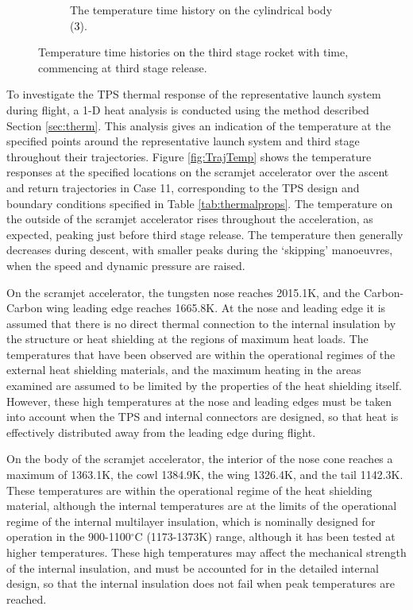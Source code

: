 \begin{figure}[ht]
\begin{subfigure}{.495\textwidth}
		\caption{The temperature time history on the cylindrical body (\textcolor{black}{3}).}
	\end{subfigure}
	\caption{Temperature time histories on the third stage rocket with time, commencing at third stage release. }
	\label{fig:TrajTemp3}
\end{figure}
\noindent
To investigate the TPS thermal response of the representative launch system during flight, a 1-D heat analysis is conducted using the method described Section \ref{sec:therm}.
This analysis gives an indication of the temperature at the specified points around the representative launch system and third stage throughout their trajectories. 
Figure \ref{fig:TrajTemp} shows the temperature responses at the specified locations on the scramjet accelerator over the ascent and return trajectories in Case 11, corresponding to the TPS design and boundary conditions specified in Table \ref{tab:thermalprops}. The temperature on the outside of the scramjet accelerator rises throughout the acceleration, as expected, peaking just before third stage release. The temperature then generally decreases during descent, with smaller peaks during the `skipping' manoeuvres, when the speed and dynamic pressure are raised.

On the scramjet accelerator, the tungsten nose reaches 2015.1K, and the Carbon-Carbon wing leading edge reaches 1665.8K. 
At the nose and leading edge it is assumed that there is no direct thermal connection to the internal insulation by the structure or heat shielding at the regions of maximum heat loads. The temperatures that have been observed are within the operational regimes of the external heat shielding materials\cite{Fitzer,Leonhardt}, and the maximum heating in the areas examined are assumed to be limited by the properties of the heat shielding itself. However, these high temperatures at the nose and leading edges must be taken into account when the TPS and internal connectors are designed, so that heat is effectively distributed away from the leading edge during flight. 

On the body of the scramjet accelerator, the interior of the nose cone reaches a maximum of 1363.1K, the cowl 1384.9K, the wing 1326.4K, and the tail 1142.3K.
These temperatures are within the operational regime of the heat shielding material, although the internal temperatures are at the limits of the operational regime of the internal multilayer insulation, which is nominally designed for operation in the 900-1100$^\circ$C (1173-1373K) range, although it has been tested at higher temperatures\cite{Kourtides}. These high temperatures may affect the mechanical strength of the internal insulation\cite{Kourtides}, and must be accounted for in the detailed internal design, so that the internal insulation does not fail when peak temperatures are reached. 

